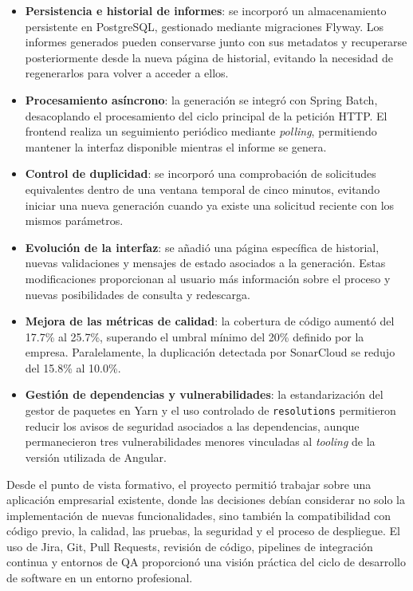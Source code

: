 \documentclass[11pt,a4paper,titlepage,oneside]{report}
\begin{document}
\begin{itemize}

  \item \textbf{Persistencia e historial de informes}: se incorporó un
  almacenamiento persistente en PostgreSQL, gestionado mediante migraciones
  Flyway. Los informes generados pueden conservarse junto con sus metadatos y
  recuperarse posteriormente desde la nueva página de historial, evitando la
  necesidad de regenerarlos para volver a acceder a ellos.

  \item \textbf{Procesamiento asíncrono}: la generación se integró con Spring
  Batch, desacoplando el procesamiento del ciclo principal de la petición
  HTTP. El frontend realiza un seguimiento periódico mediante
  \textit{polling}, permitiendo mantener la interfaz disponible mientras el
  informe se genera.

  \item \textbf{Control de duplicidad}: se incorporó una comprobación de
  solicitudes equivalentes dentro de una ventana temporal de cinco minutos,
  evitando iniciar una nueva generación cuando ya existe una solicitud
  reciente con los mismos parámetros.

  \item \textbf{Evolución de la interfaz}: se añadió una página específica de
  historial, nuevas validaciones y mensajes de estado asociados a la
  generación. Estas modificaciones proporcionan al usuario más información
  sobre el proceso y nuevas posibilidades de consulta y redescarga.

  \item \textbf{Mejora de las métricas de calidad}: la cobertura de código
  aumentó del 17.7\% al 25.7\%, superando el umbral mínimo del 20\% definido
  por la empresa. Paralelamente, la duplicación detectada por SonarCloud se
  redujo del 15.8\% al 10.0\%.

  \item \textbf{Gestión de dependencias y vulnerabilidades}: la
  estandarización del gestor de paquetes en Yarn y el uso controlado de
  \texttt{resolutions} permitieron reducir los avisos de seguridad asociados
  a las dependencias, aunque permanecieron tres vulnerabilidades menores
  vinculadas al \textit{tooling} de la versión utilizada de Angular.

\end{itemize}

Desde el punto de vista formativo, el proyecto permitió trabajar sobre una
aplicación empresarial existente, donde las decisiones debían considerar no
solo la implementación de nuevas funcionalidades, sino también la
compatibilidad con código previo, la calidad, las pruebas, la seguridad y el
proceso de despliegue. El uso de Jira, Git, Pull Requests, revisión de código,
pipelines de integración continua y entornos de QA proporcionó una visión
práctica del ciclo de desarrollo de software en un entorno profesional. \\
\end{document}
